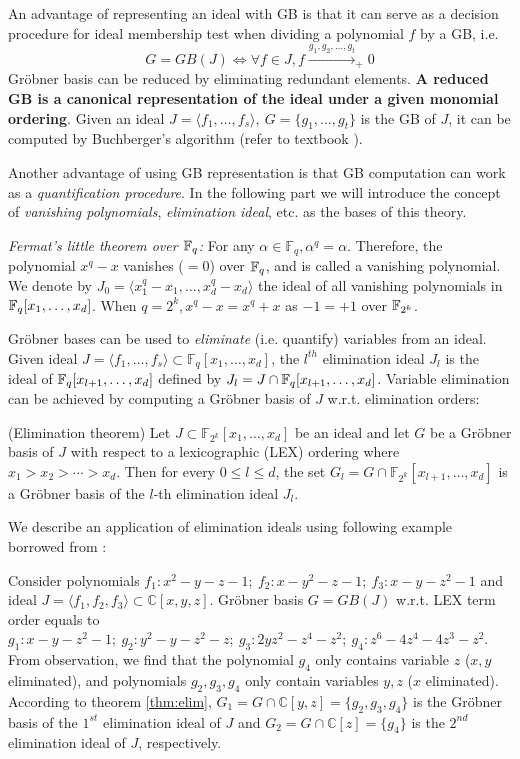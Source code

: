 An advantage of representing an ideal with GB is that it can serve as a decision procedure for ideal membership
test when dividing a polynomial $f$ by a GB, i.e.
$$G = GB(J) \Longleftrightarrow \forall f\in J, f\xrightarrow{g_1,g_2,\dots,g_t}_{+} 0$$
Gr\"obner basis can be reduced by eliminating redundant elements. \textbf{A reduced GB is a canonical representation of 
the ideal under a given monomial ordering}. Given an ideal $J = \langle f_1,\dots,f_s\rangle, ~G = 
\{g_1,\dots,g_t\}$ is the GB of $J$, it can be computed by Buchberger's algorithm (refer to textbook \cite{ideal:book}).

Another advantage of using GB representation is that GB computation can work as a {\it quantification procedure}.
In the following part we will introduce the concept of \textit{vanishing polynomials}, \textit{elimination ideal}, etc.
as the bases of this theory.

{\it Fermat's little theorem over ${\mathbb{F}}_{q}$:} For any $ \alpha \in \mathbb
F_{q}, \alpha^q = \alpha$. Therefore, the polynomial $x^q - x$
vanishes ($=0$) over ${\mathbb{F}}_{q}$, and is called a vanishing polynomial. We
denote by $J_0 = \langle x_1^q - x_1, \dots, x_d^q - x_d \rangle$ the
ideal of all vanishing polynomials in ${\mathbb{F}}_{q}[x_1, \dots, x_d]$. When $q
= 2^k, x^q - x = x^q + x$ as $-1 = +1$ over ${\mathbb{F}}_{2^k}$.

Gr\"obner bases can be used to {\it eliminate} (i.e. quantify) variables from an
ideal. Given ideal $J = \langle f_1,\dots,f_s\rangle \subset \mathbb
F_{q}[x_1,\dots,x_d]$, the $l^{th}$ elimination ideal $J_l$ is the
ideal of ${\mathbb{F}}_{q}[x_{l+1}, \dots, x_d]$ defined by $J_l = J \cap
{\mathbb{F}}_{q}[x_{l+1}, \dots, x_d]$. Variable elimination can be achieved 
by computing a Gr\"obner basis of $J$ w.r.t. elimination orders: 
\begin{Theorem}
\label{thm:elim}
(Elimination theorem\cite{ideals:book}) Let $J\subset \mathbb
  F_{2^k}[x_1,\dots,x_d]$ be an ideal and let $G$ be a Gr\"obner basis
  of $J$ with respect to a lexicographic (LEX) ordering where
  $x_1>x_2>\cdots>x_d$. Then for every $0\leq l\leq d$, the set $G_l =
  G\cap\mathbb F_{2^k}[x_{l+1},\dots,x_d]$ is a Gr\"obner basis of
  the $l$-th elimination ideal $J_l$.
\end{Theorem}
We describe an application of elimination ideals using following example borrowed from \cite{ideals:book}:
\begin{Example}
Consider polynomials $f_1: x^2-y-z-1;\ f_2:x-y^2-z-1;\ f_3:x-y-z^2-1$ and ideal $J = \langle f_1,f_2,f_3\rangle
\subset \mathbb C[x,y,z]$. Gr\"obner basis $G = GB(J)$ w.r.t. LEX term order equals to 
$g_1:x-y-z^2-1;\ g_2:y^2-y-z^2-z;\ g_3: 2yz^2-z^4-z^2;\ g_4:z^6-4z^4-4z^3-z^2$. From observation,
we find that the polynomial $g_4$ only contains variable $z$ ($x,y$ eliminated), and polynomials $g_2,g_3,g_4$ only contain variables
$y,z$ ($x$ eliminated). According to theorem \ref{thm:elim}, $G_1 = G\cap\mathbb C[y,z] = \{g_2,g_3,g_4\}$
is the Gr\"obner basis of the $1^{st}$ elimination ideal of $J$ and $G_2 = G\cap\mathbb C[z] = \{g_4\}$ is the 
$2^{nd}$ elimination ideal of $J$, respectively.
\end{Example}


